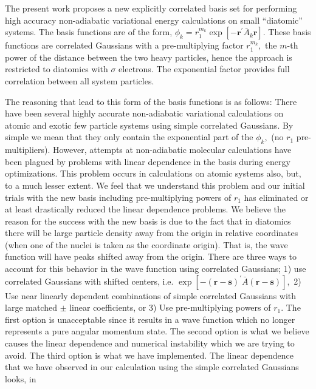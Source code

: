 \documentclass[12pt]{article}
\begin{document}
The present work proposes a new explicitly correlated basis set for performing
high accuracy non-adiabatic variational energy calculations on small
``diatomic'' systems. The basis functions are of the form, $\phi_{k}%
=r_{1}^{m_{k}}\exp[-\mathbf{r}^{\prime}\bar{A}_{k}\mathbf{r}]$. These basis
functions are correlated Gaussians with a pre-multiplying factor $r_{1}%
^{m_{k}},$ the $m$-th power of the distance between the two heavy particles,
hence the approach is restricted to diatomics with $\sigma$ electrons. The
exponential factor provides full correlation between all system particles.

The reasoning that lead to this form of the basis functions is as follows:
There have been several highly accurate non-adiabatic variational calculations
on atomic and exotic few particle systems using simple correlated
Gaussians\cite{Kinghorn93,Kinghorn95b,Kozlowski93b,Kinghorn97a,Varga96}. By
simple we mean that they only contain the exponential part of the $\phi_{k},$
(no $r_{1}$ pre-multipliers). However, attempts at non-adiabatic molecular
calculations have been plagued by problems with linear dependence in the basis
during energy optimizations. This problem occurs in calculations on atomic
systems also, but, to a much lesser extent. We feel that we understand this
problem and our initial trials with the new basis including pre-multiplying
powers of $r_{1}$ has eliminated or at least drastically reduced the linear
dependence problems. We believe the reason for the success with the new basis
is due to the fact that in diatomics there will be large particle density away
from the origin in relative coordinates (when one of the nuclei is taken as
the coordinate origin). That is, the wave function will have peaks shifted
away from the origin. There are three ways to account for this behavior in the
wave function using correlated Gaussians; 1) use correlated Gaussians with
shifted centers, i.e. $\exp[-\left(  \mathbf{r-s}\right)  ^{\prime
}\bar{A}\left(  \mathbf{r-s}\right)  ],$ 2) Use near linearly dependent
combinations of simple correlated Gaussians with large matched $\pm$ linear
coefficients, or 3) Use pre-multiplying powers of $r_{1}$. The first option is
unacceptable since it results in a wave function which no longer represents a
pure angular momentum state. The second option is what we believe causes the
linear dependence and numerical instability which we are trying to avoid. The
third option is what we have implemented. The linear dependence that we have
observed in our calculation using the simple correlated Gaussians looks, in
\end{document}
